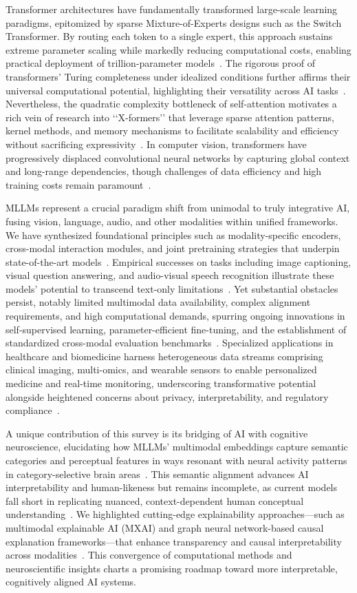 \documentclass[sigconf]{acmart}
\begin{document}
Transformer architectures have fundamentally transformed large-scale learning paradigms, epitomized by sparse Mixture-of-Experts designs such as the Switch Transformer. By routing each token to a single expert, this approach sustains extreme parameter scaling while markedly reducing computational costs, enabling practical deployment of trillion-parameter models~\cite{ref14}. The rigorous proof of transformers’ Turing completeness under idealized conditions further affirms their universal computational potential, highlighting their versatility across AI tasks~\cite{ref15}. Nevertheless, the quadratic complexity bottleneck of self-attention motivates a rich vein of research into ‘‘X-formers’’ that leverage sparse attention patterns, kernel methods, and memory mechanisms to facilitate scalability and efficiency without sacrificing expressivity~\cite{ref21}. In computer vision, transformers have progressively displaced convolutional neural networks by capturing global context and long-range dependencies, though challenges of data efficiency and high training costs remain paramount~\cite{ref22}.

MLLMs represent a crucial paradigm shift from unimodal to truly integrative AI, fusing vision, language, audio, and other modalities within unified frameworks. We have synthesized foundational principles such as modality-specific encoders, cross-modal interaction modules, and joint pretraining strategies that underpin state-of-the-art models~\cite{ref28}. Empirical successes on tasks including image captioning, visual question answering, and audio-visual speech recognition illustrate these models’ potential to transcend text-only limitations~\cite{ref28}. Yet substantial obstacles persist, notably limited multimodal data availability, complex alignment requirements, and high computational demands, spurring ongoing innovations in self-supervised learning, parameter-efficient fine-tuning, and the establishment of standardized cross-modal evaluation benchmarks~\cite{ref28}. Specialized applications in healthcare and biomedicine harness heterogeneous data streams comprising clinical imaging, multi-omics, and wearable sensors to enable personalized medicine and real-time monitoring, underscoring transformative potential alongside heightened concerns about privacy, interpretability, and regulatory compliance~\cite{ref12,ref21}.

A unique contribution of this survey is its bridging of AI with cognitive neuroscience, elucidating how MLLMs’ multimodal embeddings capture semantic categories and perceptual features in ways resonant with neural activity patterns in category-selective brain areas~\cite{ref23}. This semantic alignment advances AI interpretability and human-likeness but remains incomplete, as current models fall short in replicating nuanced, context-dependent human conceptual understanding~\cite{ref24}. We highlighted cutting-edge explainability approaches—such as multimodal explainable AI (MXAI) and graph neural network-based causal explanation frameworks—that enhance transparency and causal interpretability across modalities~\cite{ref25,ref26}. This convergence of computational methods and neuroscientific insights charts a promising roadmap toward more interpretable, cognitively aligned AI systems.
\end{document}
